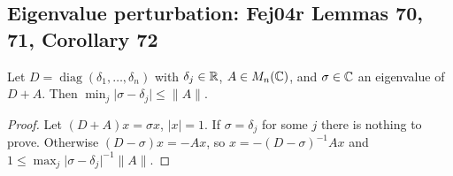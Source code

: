 \subsection{Eigenvalue perturbation: Fej04r Lemmas 70, 71, Corollary 72}\label{bpP:p9:sec-pert}

\begin{lemma}\label{bpP:p9:lemma70}
Let $D=\operatorname{diag}(\delta_1,\dots,\delta_n)$ with $\delta_j\in\mathbb{R}$, $A\in M_n(\mathbb{C})$, and $\sigma\in\mathbb{C}$ an eigenvalue of $D+A$. Then $\min_j\lvert\sigma-\delta_j\rvert\le\lVert A\rVert$.
\end{lemma}
\begin{proof}
\label{stepP:p9:l70} Let $(D+A)x=\sigma x$, $\lvert x\rvert=1$. If $\sigma=\delta_j$ for some $j$ there is nothing to prove. Otherwise $(D-\sigma)x=-Ax$, so $x=-(D-\sigma)^{-1}Ax$ and $1\le\max_j\lvert\sigma-\delta_j\rvert^{-1}\lVert A\rVert$.
\end{proof}

